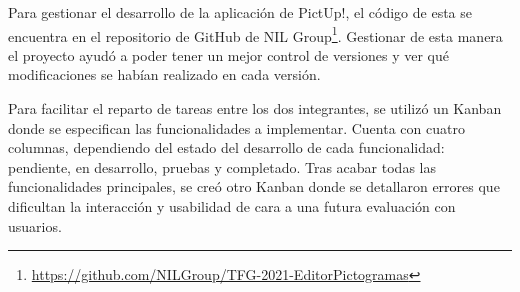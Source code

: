 Para gestionar el desarrollo de la aplicación de PictUp!, el código de esta se encuentra en el repositorio de GitHub de NIL Group\footnote{\url{https://github.com/NILGroup/TFG-2021-EditorPictogramas}}. Gestionar de esta manera el proyecto ayudó a poder tener un mejor control de versiones y ver qué modificaciones se habían realizado en cada versión.

Para facilitar el reparto de tareas entre los dos integrantes, se utilizó un Kanban donde se especifican las funcionalidades a implementar. Cuenta con cuatro columnas, dependiendo del estado del desarrollo de cada funcionalidad: pendiente, en desarrollo, pruebas y completado. Tras acabar todas las funcionalidades principales, se creó otro Kanban donde se detallaron errores que dificultan la interacción y usabilidad de cara a una futura evaluación con usuarios. 






